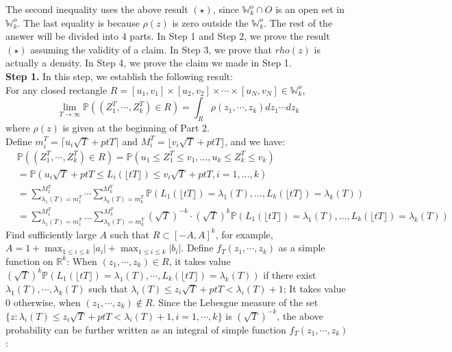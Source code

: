 \documentclass[12pt]{article}
\begin{document}
The second inequality uses the above result $(\star)$, since $\mathbb{W}_{k}^{o}\cap O$ is an open set in $\mathbb{W}_{k}^{o}$. The last equality is because $\rho(z)$ is zero outside the $\mathbb{W}_{k}^{o}$. The rest of the answer will be divided into $4$ parts. In Step 1 and Step 2, we prove the result $(\star)$ assuming the validity of a claim. In Step 3, we prove that $rho(z)$ is actually a density. In Step 4, we prove the claim we made in Step 1.\\
\textbf{Step 1. }In this step, we establish the following result:\\
For any closed rectangle $R=[u_{1},v_{1}]\times [u_{2},v_{2}]\times\cdots\times[u_{N},v_{N}]\in\mathbb{W}_{k}^{o}$, 
$$\lim_{T\rightarrow\infty}\mathbb{P}((Z_{1}^{T},\cdots,Z_{k}^{T})\in R)=\int_{R}\rho(z_{1},\cdots,z_{k})dz_{1}\cdots dz_{k}$$
where $\rho(z)$ is given at the beginning of Part 2.\\
Define $m_{i}^{T}=\lceil u_{i}\sqrt{T}+ptT\rceil$ and $M_{i}^{T}=\lfloor v_{i}\sqrt{T}+ptT\rfloor$, and we have:
\begin{align*}
&\mathbb{P}((Z_{1}^{T},\cdots,Z_{k}^{T})\in R)=\mathbb{P}(u_{1}\leqslant Z_{1}^{T} \leqslant v_{1}, \dots,  u_{k}\leqslant Z_{k}^{T} \leqslant v_{k})\\
&=\mathbb{P}(u_{i}\sqrt{T}+ptT\leqslant L_{i}(\lfloor tT\rfloor) \leqslant v_{i}\sqrt{T}+ptT, i=1,\dots, k)\\
&=\sum_{\lambda_{1}(T)=m_{1}^{T}}^{M_{1}^{T}}\cdots\sum_{\lambda_{k}(T)=m_{k}^{T}}^{M_{k}^{T}}\mathbb{P}(L_{1}(\lfloor tT \rfloor)=\lambda_{1}(T),\dots,L_{k}(\lfloor tT \rfloor)=\lambda_{k}(T))\\
&=\sum_{\lambda_{1}(T)=m_{1}^{T}}^{M_{1}^{T}}\dots\sum_{\lambda_{k}(T)=m_{k}^{T}}^{M_{k}^{T}}(\sqrt{T})^{-k}\cdot(\sqrt{T})^{k}\mathbb{P}(L_{1}(\lfloor tT \rfloor)=\lambda_{1}(T),\dots,L_{k}(\lfloor tT \rfloor)=\lambda_{k}(T))
\end{align*}
Find sufficiently large $A$ such that $R\subset[-A,A]^{k}$, for example, $A=1+\max_{1\leqslant i\leqslant k}|a_{i}|+\max_{1\leqslant i\leqslant k}|b_{i}|$. Define $f_{T}(z_{1},\cdots,z_{k})$ as a simple function on $\mathbb{R}^{k}$: When $(z_{1},\cdots,z_{k})\in R$, it takes value $(\sqrt{T})^{k}\mathbb{P}(L_{1}(\lfloor tT \rfloor)=\lambda_{1}(T),\cdots,L_{k}(\lfloor tT \rfloor)=\lambda_{k}(T)) $ if there exist $\lambda_{1}(T),\cdots,\lambda_{k}(T)$ such that $\lambda_{i}(T)\leqslant z_{i}\sqrt{T}+ptT<\lambda_{i}(T)+1$; It takes value $0$ otherwise, when $(z_{1},\cdots,z_{k})\notin R$.  Since the Lebesgue measure of the set $\{z:\lambda_{i}(T)\leqslant z_{i}\sqrt{T}+ptT<\lambda_{i}(T)+1,i=1,\cdots,k\}$ is $(\sqrt{T})^{-k}$, the above probability can be further written as an integral of simple function $f_{T}(z_{1},\cdots,z_{k})$:
\end{document}
